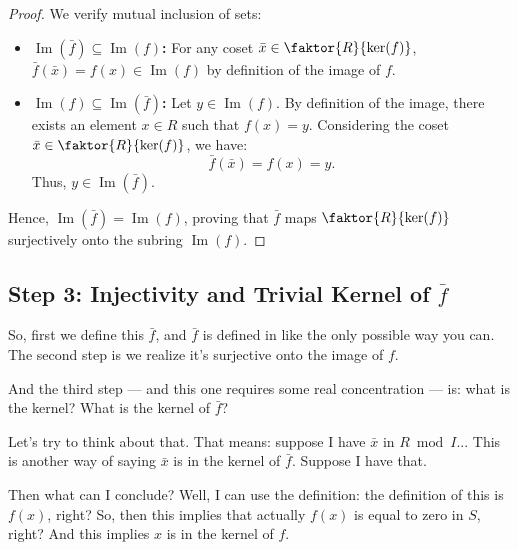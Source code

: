 \begin{proofWrapper}
\begin{content}
\begin{proof}
We verify mutual inclusion of sets:
\begin{itemize}
    \item \textbf{$\operatorname{Im}(\bar{f}) \subseteq \operatorname{Im}(f)$:} For any coset $\bar{x} \in \faktor{R}{\ker(f)}$, $\bar{f}(\bar{x}) = f(x) \in \operatorname{Im}(f)$ by definition of the image of $f$.
    \item \textbf{$\operatorname{Im}(f) \subseteq \operatorname{Im}(\bar{f})$:} Let $y \in \operatorname{Im}(f)$. By definition of the image, there exists an element $x \in R$ such that $f(x) = y$. Considering the coset $\bar{x} \in \faktor{R}{\ker(f)}$, we have:
    \[
    \bar{f}(\bar{x}) = f(x) = y.
    \]
    Thus, $y \in \operatorname{Im}(\bar{f})$.
\end{itemize}
Hence, $\operatorname{Im}(\bar{f}) = \operatorname{Im}(f)$, proving that $\bar{f}$ maps $\faktor{R}{\ker(f)}$ surjectively onto the subring $\operatorname{Im}(f)$.
\end{proof}
\end{content}

\subsection{Step 3: Injectivity and Trivial Kernel of \texorpdfstring{$\bar{f}$}{fbar}}

\begin{speech}[01:04:17 - 01:06:42]
So, first we define this $\bar{f}$, and $\bar{f}$ is defined in like the only possible way you can. The second step is we realize it's surjective onto the image of $f$. 

And the third step --- and this one requires some real concentration --- is: what is the kernel? What is the kernel of $\bar{f}$?  

Let's try to think about that. That means: suppose I have $\bar{x}$ in $R \bmod I$...  This is another way of saying $\bar{x}$ is in the kernel of $\bar{f}$. Suppose I have that. 

Then what can I conclude? Well, I can use the definition: the definition of this is $f(x)$, right? So, then this implies that actually $f(x)$ is equal to zero in $S$, right?  And this implies $x$ is in the kernel of $f$.  


\end{speech}
\end{proofWrapper}
